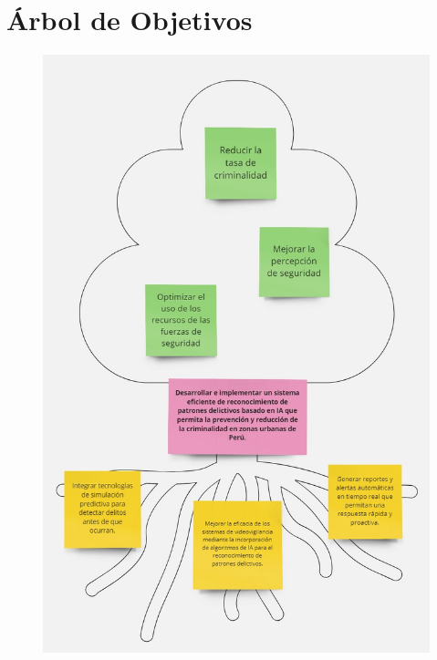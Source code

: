 	\section{Árbol de Objetivos}
	\label{anexo2}
	\begin{figure}[h]
		\begin{center}
			\includegraphics[width=1.00\textwidth]{anexos/arbol de objetivos (1).jpg}
		\end{center}
	\end{figure}
	\clearpage
	
